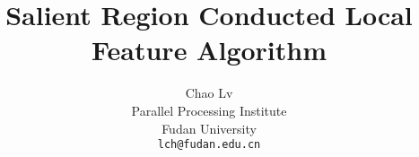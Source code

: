\documentclass[10pt,twocolumn,letterpaper]{article}
\begin{document}
\title{Salient Region Conducted Local Feature Algorithm}

\author{
	\alignauthor
	Chao Lv\\
    Parallel Processing Institute\\
    Fudan University\\
    {\tt\small lch@fudan.edu.cn}
}

\maketitle
















%

{\small


}
\end{document}
